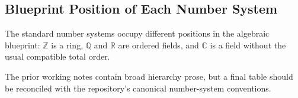 \subsection*{Blueprint Position of Each Number System}
\label{subsec:blueprint-position-of-each-number-system}

\begin{remark*}[Exposition]
The standard number systems occupy different positions in the algebraic
blueprint: $\mathbb{Z}$ is a ring, $\mathbb{Q}$ and $\mathbb{R}$ are ordered
fields, and $\mathbb{C}$ is a field without the usual compatible total order.
\end{remark*}

\begin{remark*}
The prior working notes contain broad hierarchy prose, but a final table
should be reconciled with the repository's canonical number-system conventions.
\end{remark*}
